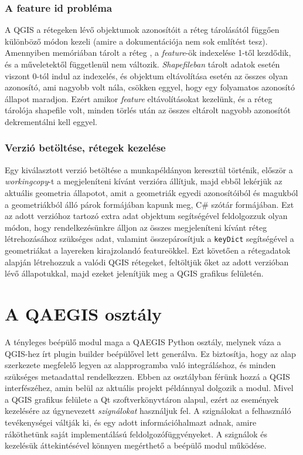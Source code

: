 \subsubsection{A feature id probléma}
A QGIS a rétegeken lévő objektumok azonosítóit a réteg tárolásától függően különböző módon kezeli (amire a dokumentációja nem sok említést tesz). Amennyiben memóriában tárolt a réteg , a \emph{feature}-ök indexelése 1-től kezdődik, és a műveletektől függetlenül nem változik. \emph{Shapefileban} tárolt adatok esetén viszont 0-tól indul az indexelés, és objektum eltávolítása esetén az összes olyan azonosító, ami nagyobb volt nála, csökken eggyel, hogy egy folyamatos azonosító állapot maradjon. Ezért amikor \emph{feature} eltávolításokat kezelünk, és a réteg tárolója shapefile volt, minden törlés után az összes eltárolt nagyobb azonosítót dekrementálni kell eggyel.
\subsubsection{Verzió betöltése, rétegek kezelése}
Egy kiválasztott verzió betöltése a munkapéldányon keresztül történik, először a \emph{workingcopy}-t a megjeleníteni kívánt verzióra állítjuk, majd ebből lekérjük az aktuális geometria állapotot, amit a geometriák egyedi azonosítóiból és magukból a geometriákból álló párok formájában kapunk meg, C\# szótár formájában. Ezt az adott verzióhoz tartozó extra adat objektum segítségével feldolgozzuk olyan módon, hogy rendelkezésünkre álljon az összes megjeleníteni kívánt réteg létrehozásához szükséges adat, valamint összepárosítjuk a \texttt{keyDict} segítségével a geometriákat a layereken kirajzolandó featureökkel. Ezt követően a rétegadatok alapján létrehozzuk a valódi QGIS rétegeket, feltöltjük őket az adott verzióban lévő állapotukkal, majd ezeket jelenítjük meg a QGIS grafikus felületén.

\section{A QAEGIS osztály}
A tényleges beépülő modul maga a QAEGIS Python osztály, melynek váza a QGIS-hez írt plugin builder beépülővel lett generálva. Ez biztosítja, hogy az alap szerkezete megfelelő legyen az alapprogramba való integráláshoz, és minden szükséges metaadattal rendelkezzen. Ebben az osztályban férünk hozzá a QGIS interfészéhez, amin belül az aktuális projekt példánnyal dolgozik a modul. Mivel a QGIS grafikus felülete a Qt szoftverkönyvtáron alapul, ezért az események kezelésére az úgynevezett \emph{szignálokat} használjuk fel. A szignálokat a felhasználó tevékenységei váltják ki, és egy adott információhalmazt adnak, amire ráköthetünk saját implementálású feldolgozófüggvényeket. A szignálok és kezelésük áttekintésével könnyen megérthető a beépülő modul működése.
